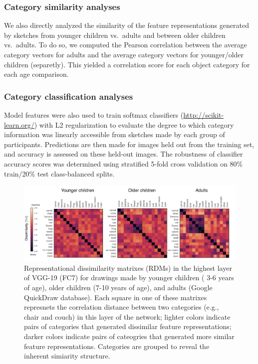 \documentclass[10pt, letterpaper]{article}
\newenvironment{CodeChunk}{}{}
\begin{document}
\subsubsection{Category similarity
analyses}\label{category-similarity-analyses}

We also directly analyzed the similarity of the feature representations
generated by sketches from younger children vs.~adults and between older
children vs.~adults. To do so, we computed the Pearson correlation
between the average category vectors for adults and the average category
vectors for younger/older children (separetly). This yielded a
correlation score for each object category for each age comparison.

\subsubsection{Category classification
analyses}\label{category-classification-analyses}

Model features were also used to train softmax classifiers
(\url{http://scikit-learn.org/}) with L2 regularization to evaluate the
degree to which category information was linearly accessible from
sketches made by each group of participants. Predictions are then made
for images held out from the training set, and accuracy is assessed on
these held-out images. The robustness of classifier accuracy scores was
determined using stratified 5-fold cross validation on 80\% train/20\%
test class-balanced splits.

\begin{CodeChunk}
\begin{figure}[h]

{\centering \includegraphics{figs/RSAAllCat-1} 

}

\caption[Representational dissimilarity matrixes (RDMs) in the highest layer of VGG-19 (FC7) for drawings made by younger children ( 3-6 years of age), older children (7-10 years of age), and adults (Google QuickDraw database)]{Representational dissimilarity matrixes (RDMs) in the highest layer of VGG-19 (FC7) for drawings made by younger children ( 3-6 years of age), older children (7-10 years of age), and adults (Google QuickDraw database). Each square in one of these matrixes represnets the correlation distance between two categories (e.g., chair and couch) in this layer of the network; lighter colors indicate pairs of categories that generated dissimilar feature representations; darker colors indicate pairs of cateogries that generated more similar feature representations. Categories are grouped to reveal the inherent simiarity structure.}\label{fig:RSAAllCat}
\end{figure}
\end{CodeChunk}
\end{document}
